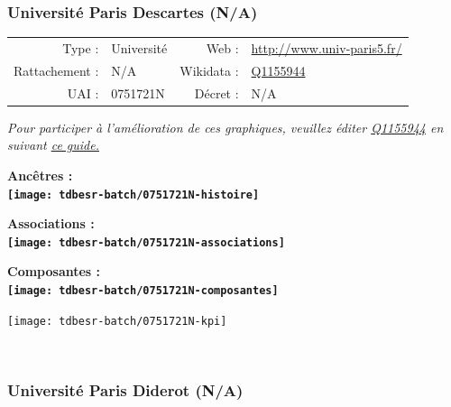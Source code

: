 \documentclass[12pt,french,]{article}
\begin{document}
\hypertarget{universituxe9-paris-descartes-na}{%
\subsubsection{Université Paris Descartes
(N/A)}\label{universituxe9-paris-descartes-na}}

\begin{tabular*}{\textwidth}{rp{5cm}rl}  
\hline  
Type : & Université & Web : &\href{http://www.univ-paris5.fr/}{http://www.univ-paris5.fr/} \\  
Rattachement : & N/A & Wikidata : & \href{https://www.wikidata.org/entity/Q1155944}{Q1155944} \\  
UAI : & 0751721N & Décret : & N/A \\  
\hline  
\end{tabular*}

\textit{\scriptsize Pour participer à l'amélioration de ces graphiques, veuillez éditer  \href{https://www.wikidata.org/entity/Q1155944}{Q1155944}  en suivant \href{https://github.com/cpesr/wikidataESR/blob/master/Rmd/wikidataESR.md}{ce guide.}}

\vspace{1cm}  
\begin{minipage}[b]{0.50\textwidth}\begin{center} \bf Ancêtres : \\  
\texttt{[image: tdbesr-batch/0751721N-histoire]} \end{center}\end{minipage}\begin{minipage}[b]{0.50\textwidth}\begin{center} \bf Associations : \\  
\texttt{[image: tdbesr-batch/0751721N-associations]} \end{center}\end{minipage}

\hrulefill

\begin{center} \bf Composantes : \\  
\texttt{[image: tdbesr-batch/0751721N-composantes]} \end{center}

\begin{center}\texttt{[image: tdbesr-batch/0751721N-kpi]} \end{center}\checkoddpage

\ifoddpage \fi ~\newpage  

\hypertarget{universituxe9-paris-diderot-na}{%
\subsubsection{Université Paris Diderot
(N/A)}\label{universituxe9-paris-diderot-na}}
\end{document}
